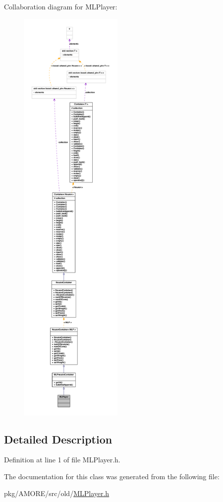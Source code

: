 Collaboration diagram for MLPlayer:
\nopagebreak
\begin{figure}[H]
\begin{center}
\leavevmode
\includegraphics[height=600pt]{class_m_l_player__coll__graph}
\end{center}
\end{figure}


\subsection{Detailed Description}


Definition at line 1 of file MLPlayer.h.



The documentation for this class was generated from the following file:\begin{DoxyCompactItemize}
\item 
pkg/AMORE/src/old/\hyperlink{_m_l_player_8h}{MLPlayer.h}\end{DoxyCompactItemize}

